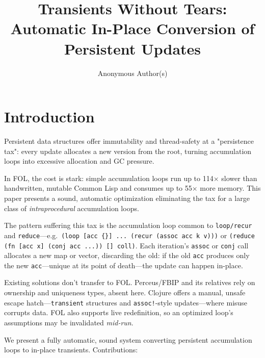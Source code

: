 \documentclass[sigplan,review,anonymous]{acmart}
\title[Transients Without Tears]{Transients Without Tears: Automatic In-Place Conversion of Persistent Updates}
\author{Anonymous Author(s)}
\affiliation{%
  \institution{Anonymous Institution}
  \city{Anonymous City}
  \country{Anonymous Country}
}
\begin{document}
\maketitle

\section{Introduction}

Persistent data structures offer immutability and thread-safety at a "persistence tax": every update allocates a new version from the root, turning accumulation loops into excessive allocation and GC pressure.

In FOL, the cost is stark: simple accumulation loops run up to 114$\times$ slower than handwritten, mutable Common Lisp and consumes up to 55$\times$ more memory. This paper presents a sound, automatic optimization eliminating the tax for a large class of \emph{intraprocedural} accumulation loops.

The pattern suffering this tax is the accumulation loop common to \texttt{loop/recur} and \texttt{reduce}---e.g.\ \texttt{(loop [acc \{\}] ... (recur (assoc acc k v)))} or \texttt{(reduce (fn [acc x] (conj acc ...)) [] coll)}. Each iteration's \texttt{assoc} or \texttt{conj} call allocates a new map or vector, discarding the old: if the old \texttt{acc} produces only the new \texttt{acc}---unique at its point of death---the update can happen in-place.

Existing solutions don't transfer to FOL. Perceus/FBIP \cite{reinking2021perceus} and its relatives \cite{lorenzen2023functional} rely on ownership and uniqueness types, absent here. Clojure \cite{hickey2009clojure} offers a manual, unsafe escape hatch---\texttt{transient} structures and \texttt{assoc!}-style updates---where misuse corrupts data. FOL also supports live redefinition, so an optimized loop's assumptions may be invalidated \emph{mid-run}.

We present a fully automatic, sound system converting persistent accumulation loops to in-place transients. Contributions:
\end{document}
